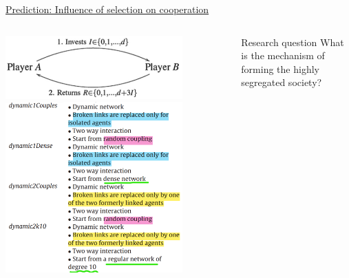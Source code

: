 \documentclass[compress]{beamer}
\begin{document}
\begin{frame}{\href{https://www.sciencedirect.com/science/article/pii/S0378873312000202}{Prediction: Influence of selection on cooperation\cite{bravo2012trust}}}

    \begin{columns}[c]
        \begin{column}{.5\textwidth}
            \centering
            \includegraphics[width=0.8\textwidth]{InvestmentGame.png}\\[0.5cm]
            \includegraphics[width=0.8\textwidth]{ABMExp.png}
        \end{column}
        \begin{column}{.5\textwidth}
            \raggedright
            \begin{minipage}{5.8cm}
                \begin{block}{Research question}
                    What is the mechanism of forming the highly segregated society?
                \end{block}

\end{minipage}
\end{column}
\end{columns}
\end{frame}
\end{document}
